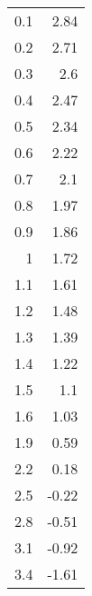 \begin{tabular}{rr}
\hline
 0.1 &  2.84 \\
 0.2 &  2.71 \\
 0.3 &  2.6  \\
 0.4 &  2.47 \\
 0.5 &  2.34 \\
 0.6 &  2.22 \\
 0.7 &  2.1  \\
 0.8 &  1.97 \\
 0.9 &  1.86 \\
 1   &  1.72 \\
 1.1 &  1.61 \\
 1.2 &  1.48 \\
 1.3 &  1.39 \\
 1.4 &  1.22 \\
 1.5 &  1.1  \\
 1.6 &  1.03 \\
 1.9 &  0.59 \\
 2.2 &  0.18 \\
 2.5 & -0.22 \\
 2.8 & -0.51 \\
 3.1 & -0.92 \\
 3.4 & -1.61 \\
\hline
\end{tabular}